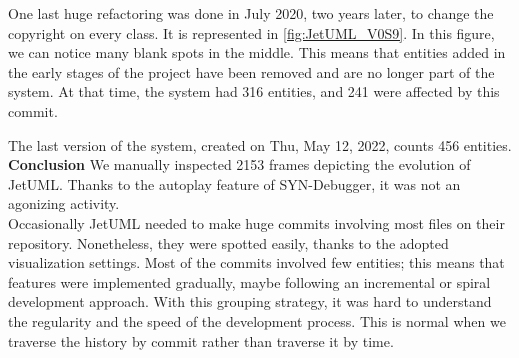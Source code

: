 One last huge refactoring was done in July 2020, two years later, to change the copyright on every class. It is represented in \autoref{fig:JetUML_V0S9}. In this figure, we can notice many blank spots in the middle. This means that entities added in the early stages of the project have been removed and are no longer part of the system. At that time, the system had 316 entities, and 241 were affected by this commit. 

The last version of the system, created on Thu, May 12, 2022, counts 456 entities. 
\bigbreak
\textbf{Conclusion}
We manually inspected 2153 frames depicting the evolution of JetUML.
Thanks to the autoplay feature of SYN-Debugger, it was not an agonizing activity. \\
Occasionally JetUML needed to make huge commits involving most files on their repository. Nonetheless, they were spotted easily, thanks to the adopted visualization settings. 
Most of the commits involved few entities; this means that features were implemented gradually, maybe following an incremental or spiral development approach. 
With this grouping strategy, it was hard to understand the regularity and the speed of the development process. This is normal when we traverse the history by commit rather than traverse it by time. 

